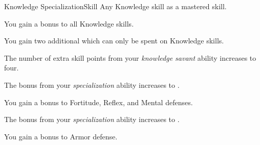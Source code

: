     \begin{feat}{Knowledge Specialization}{Skill}
        \featpre Any Knowledge skill as a mastered skill.

         You gain a  bonus to all Knowledge skills.

         You gain two additional  which can only be spent on Knowledge skills.

         The number of extra skill points from your \textit{knowledge savant} ability increases to four.

         The bonus from your \textit{specialization} ability increases to .

         You gain a  bonus to Fortitude, Reflex, and Mental defenses. 

         The bonus from your \textit{specialization} ability increases to .

         You gain a  bonus to Armor defense.
    \end{feat}

